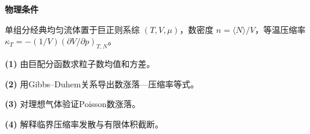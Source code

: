 \textbf{物理条件}\par 单组分经典均匀流体置于巨正则系综 \((T,V,\mu)\)，数密度 \(n=\langle N\rangle/V\)，等温压缩率 \(\kappa_T=-(1/V)(\partial V/\partial p)_{T,N}\)。
\par\noindent\textbf{(1)} 由巨配分函数求粒子数均值和方差。
\par\noindent\textbf{(2)} 用Gibbs–Duhem关系导出数涨落—压缩率等式。
\par\noindent\textbf{(3)} 对理想气体验证Poisson数涨落。
\par\noindent\textbf{(4)} 解释临界压缩率发散与有限体积截断。
